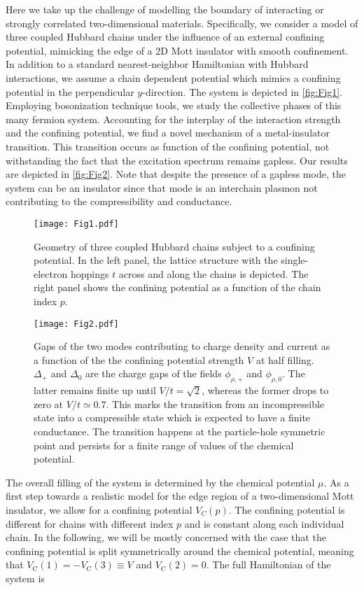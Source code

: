 \documentclass[twocolumn, prl, aps, floatfix, superscriptaddress, longbibliography]{revtex4-1}
\begin{document}
Here we take up the challenge of modelling the boundary of interacting or strongly correlated two-dimensional materials. Specifically, we consider a model of three coupled Hubbard chains under the influence of an external confining potential, mimicking the edge of a 2D Mott insulator with smooth confinement. In addition to a standard nearest-neighbor Hamiltonian with Hubbard interactions, we assume a chain dependent potential which mimics a confining potential in the perpendicular $y$-direction. The system is depicted in \autoref{fig:Fig1}. Employing bosonization technique tools, we study the collective phases of this many fermion system. Accounting for the interplay of the interaction strength and the confining potential, we find a novel mechanism of a metal-insulator transition. This transition occurs as function of the confining potential, not withstanding the fact that the excitation spectrum remains gapless. Our results are depicted in \autoref{fig:Fig2}. Note that despite the presence of a gapless mode, the system can be an insulator since that mode is an interchain plasmon not contributing to the compressibility and conductance.
%
\begin{figure}[t!]
	\centering
	\texttt{[image: Fig1.pdf]}
	\caption{Geometry of three coupled Hubbard chains subject to a confining potential. In the left panel, the lattice structure with the single-electron hoppings $t$ across and along the chains is depicted. The right panel shows the confining potential as a function of the chain index $p$.}
	\label{fig:Fig1}
\end{figure}
%
%
\begin{figure}[h!]
	\centering
	\texttt{[image: Fig2.pdf]}
	\caption{Gaps of the two   modes contributing to charge density and current as a function of the the confining potential strength $V$ at half filling. $\Delta_{+}$ and $\Delta_{0}$ are the charge gaps of the fields $\phi_{\rho,+}$ and $\phi_{\rho,0}$. The latter remains finite up until $V/t=\sqrt{2}$, whereas the former drops to zero at $V/t \simeq 0.7$. This marks the transition from an incompressible state into a compressible state which is expected to have a finite conductance. The transition happens at the particle-hole symmetric point and persists for a finite range of values of the chemical potential.}
	\label{fig:Fig2}
\end{figure}
%
The overall filling of the system is determined by the chemical potential $\mu$. As a first step towards a realistic model for the edge region of a two-dimensional Mott insulator, we allow for a confining potential $V_C(p)$. The confining potential is different for chains with different index $p$ and is constant along each individual chain. In the following, we will be mostly concerned with the case that the confining potential is split symmetrically around the chemical potential, meaning that $V_{\text{C}}(1)=-V_{\text{C}}(3) \equiv V$ and $V_{\text{C}}(2) = 0$. The full Hamiltonian of the system is 
\end{document}
